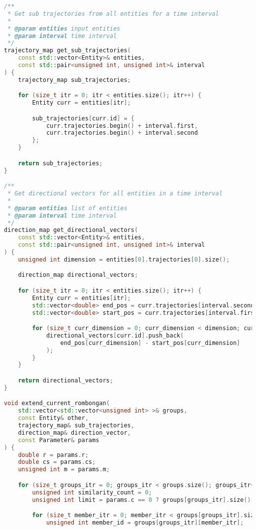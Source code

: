 \begin{lstlisting}[language=C++, caption=Implementasi fungsi \texttt{identify\_rombongan}, label={lamp:identify-rombongan}]
/**
 * Get sub trajectories from all entities for a time interval
 * 
 * @param entities input entities
 * @param interval time interval
 */
trajectory_map get_sub_trajectories(
    const std::vector<Entity>& entities,
    const std::pair<unsigned int, unsigned int>& interval
) {
    trajectory_map sub_trajectories;

    for (size_t itr = 0; itr < entities.size(); itr++) {
        Entity curr = entities[itr];

        sub_trajectories[curr.id] = {
            curr.trajectories.begin() + interval.first,
            curr.trajectories.begin() + interval.second
        };
    }

    return sub_trajectories;
}

/**
 * Get directional vectors for all entities in a time interval
 * 
 * @param entities list of entities
 * @param interval time interval
 */
direction_map get_directional_vectors(
    const std::vector<Entity>& entities,
    const std::pair<unsigned int, unsigned int>& interval
) {
    unsigned int dimension = entities[0].trajectories[0].size();

    direction_map directional_vectors;

    for (size_t itr = 0; itr < entities.size(); itr++) {
        Entity curr = entities[itr];
        std::vector<double> end_pos = curr.trajectories[interval.second - 1];
        std::vector<double> start_pos = curr.trajectories[interval.first];

        for (size_t curr_dimension = 0; curr_dimension < dimension; curr_dimension++) {
            directional_vectors[curr.id].push_back(
                end_pos[curr_dimension] - start_pos[curr_dimension]
            );
        }
    }

    return directional_vectors;
}

void extend_current_rombongan(
    std::vector<std::vector<unsigned int> >& groups,
    const Entity& other,
    trajectory_map& sub_trajectories,
    direction_map& direction_vector,
    const Parameter& params
) {
    double r = params.r;
    double cs = params.cs;
    unsigned int m = params.m;

    for (size_t groups_itr = 0; groups_itr < groups.size(); groups_itr++) {
        unsigned int similarity_count = 0;
        unsigned int limit = params.c == 0 ? groups[groups_itr].size() : params.c;

        for (size_t member_itr = 0; member_itr < groups[groups_itr].size() && similarity_count < limit; member_itr++) {
            unsigned int member_id = groups[groups_itr][member_itr];


\end{lstlisting}

